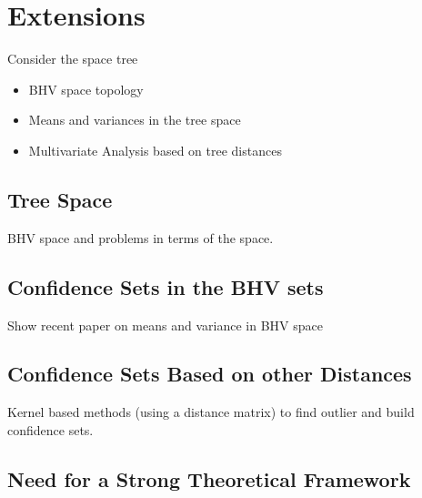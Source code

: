 \section{Extensions} \label{sec:extensions}

Consider the space tree
\begin{itemize}
 \item BHV space topology
 \item Means and variances in the tree space
 \item Multivariate Analysis based on tree distances
\end{itemize}

\subsection{Tree Space} \label{sec:Tree-distances}

BHV space and problems in terms of the space. 

\subsection{Confidence Sets in the BHV sets} \label{sec:means-and-variance}

Show recent paper on means and variance in BHV space

\subsection{Confidence Sets Based on other Distances} \label{sec:kernel}

Kernel based methods (using a distance matrix) to find outlier and build confidence sets. 

\subsection{Need for a Strong Theoretical Framework}
